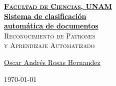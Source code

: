\documentclass[12pt, fleqn]{report}                             %
\author{Oscar Andrés Rosas}                                     %
\theoremstyle{break}                                            %
\begin{document}
\begin{titlepage}
    
    \pagecolor{TitlePageColor}                                      %
    \color{white}                                                   %

    \vspace                                                         %
    \baselineskip                                                   %

    \makebox[0pt][l]{\rule{1.3\textwidth}{3pt}}                     %
    
    \href{https://compilandoconocimiento.com}                       %
    {\textbf{\textsc{\Huge Facultad de Ciencias, UNAM}}}\\[2.7cm]      %

    \href{\ProjectNameLink}                                         %
    {\fontsize{35}{42}\selectfont \textbf{Sistema de clasificación \\automática de documentos}}\\[0.5cm] %
    \textcolor{ColorSubtext}{\textsc{\Huge Reconocimiento de Patrones \\y Aprendizaje Automatizado}}     %
    
    \vfill                                                          %
    
    \href{\ProjectAuthorLink}                                       %
    {\LARGE \textsf{Oscar Andrés Rosas Hernandez}}                  %

    \vspace                                                         %
    \baselineskip                                                   %
    
    {\large \textsf{\today}}                                        %

\end{titlepage}
\end{document}

